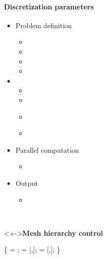 
\begin{frame}[fragile] 
\secframetitle{\ssParameters}
\framesubtitle{Discretization parameters}
\vspace{-0.2in}
\begin{minipage}[t]{1.7in}
\begin{itemize}
\item Problem definition
  \begin{itemize}
  \item {}
  \item {}
  \item {}
  \item {}
  \end{itemize}
\item {}
  \begin{itemize}
  \item {}
  \item {}
  \item \textcolor{green!50!black}{}
  \item \textcolor{green!50!black}{}
  \end{itemize}
\item Parallel computation
  \begin{itemize}
  \item {}
  \end{itemize}
\item Output
  \begin{itemize}
    \item {}
  \end{itemize}
\end{itemize}
\end{minipage} \
\begin{minipage}[t]{2.6in}
\vspace{-0.2in}
\begin{block}<+->{\textbf{Mesh hierarchy control}}
  \footnotesize \vspace{-0.1in}
\begin{semiverbatim}
 \{ 
      = ;
      = [,];
    = [,\valuetext{4}];
\}
\end{semiverbatim}
\begin{semiverbatim}
\end{semiverbatim}
\end{block}
\end{minipage}
\end{frame}

